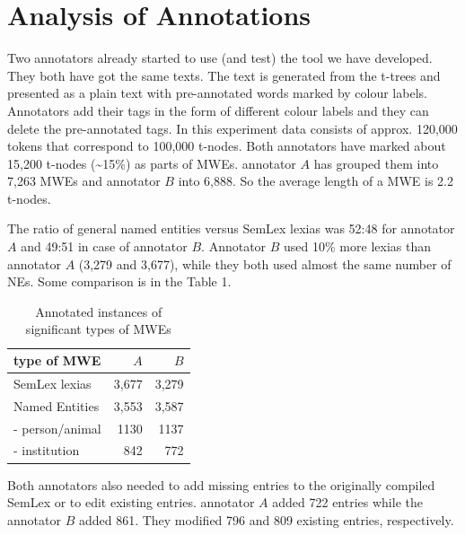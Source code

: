 \documentclass[11pt]{article}
\begin{document}
\section{Analysis of Annotations}
\label{sec:analysis}
Two annotators already started to use (and test) the tool we have developed.
They both have got the same texts. The text is generated from the t-trees and presented as a plain text with pre-annotated words mark\-ed by colour labels. Annotators add their tags in the form of different colour labels and they can delete the pre-annotated tags. 
In this experiment data consists of approx. 120,000 tokens that correspond to 100,000 t-nodes.
Both annotators have marked about 15,200 t-nodes (\textasciitilde 15\%) as parts of MWEs. annotator $A$ %
 has grouped them into 7,263 MWEs and annotator $B$ %
  into 6,888. So the average length of a MWE is 2.2 t-nodes.

The ratio of general named entities versus SemLex lexias was 52:48 for annotator $A$ and 49:51 in case of annotator $B$. Annotator $B$ used 10\% more lexias than annotator $A$ (3,279 and 3,677), while they both used almost the same number of NEs. Some comparison is in the Table 1. %

\begin{table}[h]
\begin{footnotesize}
\begin{center}
  \begin{tabular}{|l|r|r|}
\hline
type of MWE&$A$&$B$\\
\hline
SemLex lexias&3,677&3,279\\
Named Entities&3,553&3,587\\
- person/animal&1130&1137\\
- institution&842&772\\
\hline
\end{tabular}
\end{center}
\caption{Annotated instances of significant types of MWEs}
\end{footnotesize}
\label{tab:anot}
\end{table}

Both annotators also needed to add missing entries to the originally compiled SemLex or to edit existing entries. annotator $A$ added 722 entries while the annotator $B$ added 861. They modified 796 and 809 existing entries, respectively.
\end{document}

